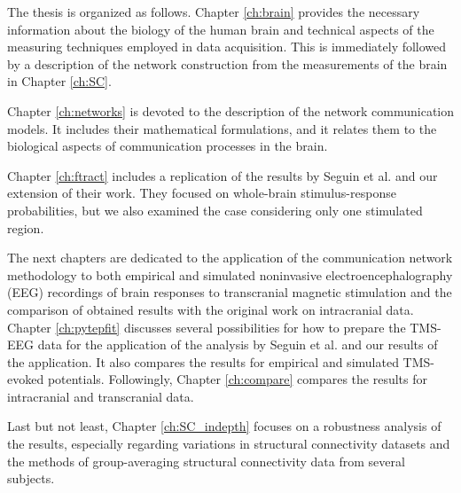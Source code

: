 The thesis is organized as follows. Chapter \ref{ch:brain} provides the necessary information about the biology of the human brain and technical aspects of the measuring techniques employed in data acquisition. This is immediately followed by a description of the network construction from the measurements of the brain in Chapter \ref{ch:SC}.

Chapter \ref{ch:networks} is devoted to the description of the network communication models. It includes their mathematical formulations, and it relates them to the biological aspects of communication processes in the brain.

Chapter \ref{ch:ftract} includes a replication of the results by Seguin et al. and our extension of their work. They focused on whole-brain stimulus-response probabilities, but we also examined the case considering only one stimulated region. 

The next chapters are dedicated to the application of the communication network methodology to both empirical and simulated noninvasive electroencephalography (EEG) recordings of brain responses to transcranial magnetic stimulation and the comparison of obtained results with the original work on intracranial data. Chapter \ref{ch:pytepfit} discusses several possibilities for how to prepare the TMS-EEG data for the application of the analysis by Seguin et al. and our results of the application. It also compares the results for empirical and simulated TMS-evoked potentials. Followingly, Chapter \ref{ch:compare} compares the results for intracranial and transcranial data.

Last but not least, Chapter \ref{ch:SC_indepth} focuses on a robustness analysis of the results, especially regarding variations in structural connectivity datasets and the methods of group-averaging structural connectivity data from several subjects.


